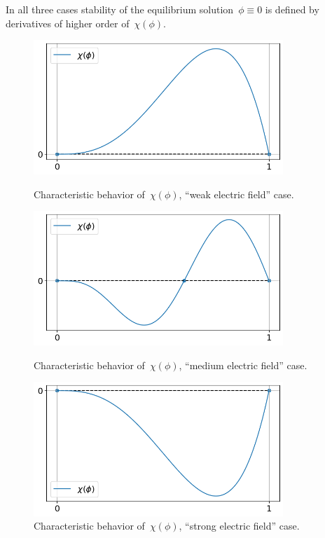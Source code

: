 In all three cases stability of the equilibrium solution~$\phi \equiv
0$ is defined by derivatives of higher order of~$\chi(\phi)$.

\begin{figure}[!tp]
  \centering
  \includegraphics[width=0.84\textwidth]{figures/equilibriums_case_1.png}
  \vspace{-0.3cm}
  \caption{Characteristic behavior of~$\chi(\phi)$,
    ``weak electric field'' case.}
  \label{fig:equilibriums_case_1}
  \vspace{0.7cm}
  
  \includegraphics[width=0.84\textwidth]{figures/equilibriums_case_2.png}
  \vspace{-0.3cm}
  \caption{Characteristic behavior of~$\chi(\phi)$,
    ``medium electric field'' case.}
  \label{fig:equilibriums_case_2}
  \vspace{0.7cm}
  
  \includegraphics[width=0.84\textwidth]{figures/equilibriums_case_3.png}
  \vspace{-0.3cm}
  \caption{Characteristic behavior of~$\chi(\phi)$,
    ``strong electric field'' case.}
  \label{fig:equilibriums_case_3}
\end{figure}

